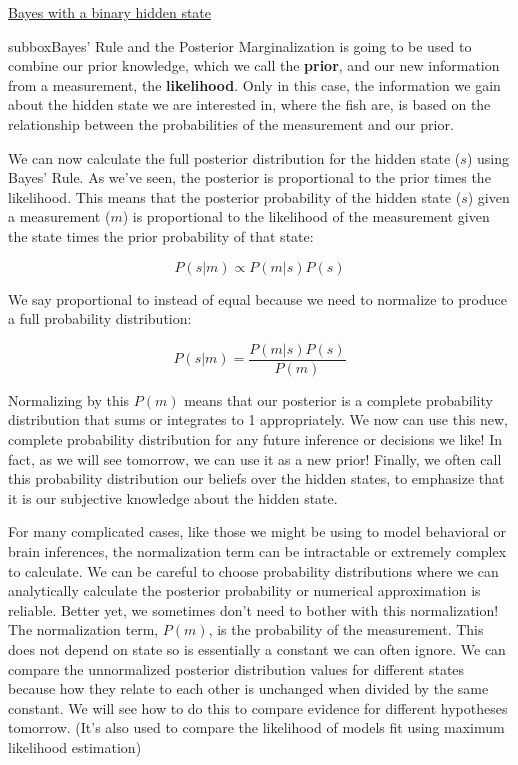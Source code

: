 \begin{textbox}{\href{https://compneuro.neuromatch.io/tutorials/W3D1_BayesianDecisions/student/W3D1_Tutorial1.html}{Bayes with a binary hidden state } }
\begin{subbox}{subbox}{Bayes' Rule and the Posterior}
\scriptsize
Marginalization is going to be used to combine our prior knowledge, which we call the \textbf{prior}, and our new information from a measurement, the \textbf{likelihood}. Only in this case, the information we gain about the hidden state we are interested in, where the fish are, is based on the relationship between the probabilities of the measurement and our prior. 

We can now calculate the full posterior distribution for the hidden state ($s$) using Bayes' Rule. As we've seen, the posterior is proportional to the prior times the likelihood. This means that the posterior probability of the hidden state ($s$) given a measurement ($m$) is proportional to the likelihood of the measurement given the state times the prior probability of that state:

\begin{equation}
P(s | m) \propto P(m | s) P(s)
\end{equation}

We say proportional to instead of equal because we need to normalize to produce a full probability distribution:

\begin{equation}
P(s | m) = \frac{P(m | s) P(s)}{P(m)}
\end{equation}

Normalizing by this $P(m)$ means that our posterior is a complete probability distribution that sums or integrates to 1 appropriately. We now can use this new, complete probability distribution for any future inference or decisions we like! In fact, as we will see tomorrow, we can use it as a new prior! Finally, we often call this probability distribution our beliefs over the hidden states, to emphasize that it is our subjective knowledge about the hidden state.

For many complicated cases, like those we might be using to model behavioral or brain inferences, the normalization term can be intractable or extremely complex to calculate. We can be careful to choose probability distributions where we can analytically calculate the posterior probability or numerical approximation is reliable. Better yet, we sometimes don't need to bother with this normalization! The normalization term, $P(m)$, is the probability of the measurement. This does not depend on state so is essentially a constant we can often ignore. We can compare the unnormalized posterior distribution values for different states because how they relate to each other is unchanged when divided by the same constant. We will see how to do this to compare evidence for different hypotheses tomorrow. (It's also used to compare the likelihood of models fit using maximum likelihood estimation)


\end{subbox}
\end{textbox}
